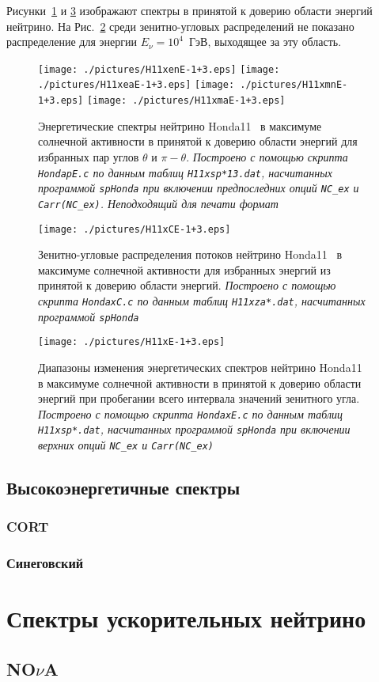 Рисунки~\ref{Honda11maxsE-1+3} и \ref{Honda11maxE-1+3} изображают спектры в принятой к доверию области энергий нейтрино. На Рис.~\ref{Honda11maxCE-1+3} среди зенитно-угловых распределений не показано распределение для энергии $E_{\nu}=10^{4}$~ГэВ, выходящее за эту область.
\begin{figure}[!ht]
\texttt{[image: ./pictures/H11xenE-1+3.eps]}
\texttt{[image: ./pictures/H11xeaE-1+3.eps]}
\texttt{[image: ./pictures/H11xmnE-1+3.eps]}
\texttt{[image: ./pictures/H11xmaE-1+3.eps]}
\caption{Энергетические спектры нейтрино Honda11~\cite{Honda:2011nf} в максимуме солнечной активности в принятой к доверию области энергий для избранных пар углов $\theta$ и $\pi-\theta$. \textit{Построено с помощью скрипта \texttt{HondapE.c} по данным таблиц \texttt{H11xsp*13.dat}, насчитанных программой \texttt{spHonda} при включении предпоследних опций \texttt{NC\_ex} и \texttt{Carr(NC\_ex)}. {\color{magenta}Неподходящий для печати формат}}}
\label{Honda11maxsE-1+3}
\end{figure}
\begin{figure}[!ht]
\begin{center}
\texttt{[image: ./pictures/H11xCE-1+3.eps]}
\end{center}
\caption{Зенитно-угловые распределения потоков нейтрино Honda11~\cite{Honda:2011nf} в максимуме солнечной активности для избранных энергий из принятой к доверию области энергий. \textit{Построено с помощью скрипта \texttt{HondaxC.c} по данным таблиц \texttt{H11xza*.dat}, насчитанных программой \texttt{spHonda}}}
\label{Honda11maxCE-1+3}
\end{figure}

\clearpage
\begin{figure}[!ht]
\begin{center}
\texttt{[image: ./pictures/H11xE-1+3.eps]}
\end{center}
\caption{Диапазоны изменения энергетических спектров нейтрино Honda11~\cite{Honda:2011nf} в максимуме солнечной активности в принятой к доверию области энергий при пробегании всего интервала значений зенитного угла. \textit{Построено с помощью скрипта \texttt{HondaxE.c} по данным таблиц \texttt{H11xsp*.dat}, насчитанных программой \texttt{spHonda} при включении верхних опций \texttt{NC\_ex} и \texttt{Carr(NC\_ex)}}}
\label{Honda11maxE-1+3}
\end{figure}

\subsection{Высокоэнергетичные спектры}
\subsubsection{CORT}
\subsubsection{Синеговский}

\section{Спектры ускорительных нейтрино}
\subsection{NO$\nu$A}
